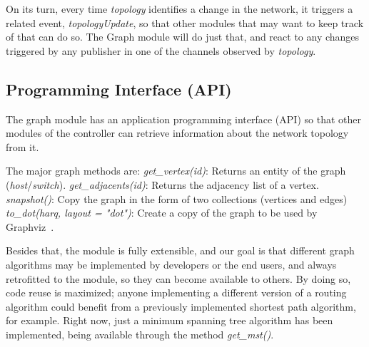 On its
turn, every time \emph{topology} identifies a change in the network, it
triggers a related event, \emph{topologyUpdate}, so that
other modules that may want to keep track of that can do so. The Graph
module will do just that, and react to any changes triggered by any
publisher in one of the channels observed by \emph{topology}.


\subsection{Programming Interface (API)}

The graph module has an application programming interface (API) so that
other modules of the controller can retrieve information about the network
topology from it.

\begin{outline}
\0 The major graph methods are:
    \1 \emph{get\_vertex(id)}:
    Returns an entity of the graph (\emph{host}/\emph{switch}).
    \1 \emph{get\_adjacents(id)}: 
    Returns the adjacency list of a vertex.
    \1 \emph{snapshot()}: 
    Copy the graph in the form of two collections (vertices and edges)
    \1 \emph{to\_dot(harq, layout = "dot")}:
    Create a copy of the graph to be used by Graphviz~\citep{john2003graphviz}.
\end{outline}

Besides that,
the module is fully extensible, and our goal is that different graph
algorithms may be implemented by developers or the end users, and always
retrofitted to the module, so they can become available to others. By doing
so, code reuse is maximized; anyone implementing a different
version of a routing algorithm could benefit from a previously implemented
shortest path algorithm, for example. Right now, just a minimum spanning
tree algorithm has been implemented, being available through the method
\emph{get\_mst()}.
